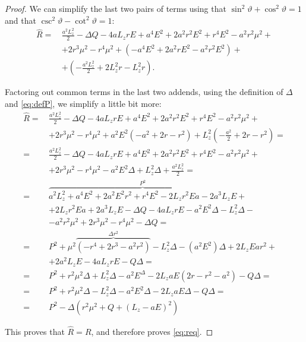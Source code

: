\begin{proof}
	We can simplify the last two pairs of terms using that $\sin^2 \vartheta + \cos^2 \vartheta = 1$ and that $\csc^2\vartheta - \cot^2\vartheta = 1$:
	\begin{align}
	\widehat{R} =\,& \frac{a^2L_z^2}{2} - \Delta Q - 4aL_zrE + a^4E^2 + 2a^2r^2E^2 + r^4E^2 - a^2r^2\mu^2 + \nonumber \\
	&+ 2r^3\mu^2 - r^4\mu^2 + \left(-a^4E^2 + 2a^2rE^2 - a^2r^2E^2 \right) + \nonumber \\
	&+ \left( -\frac{a^2L_z^2}{2} + 2L_z^2r - L_z^2r \right).
	\end{align}
	
	Factoring out common terms in the last two addends, using the definition of $\Delta$ and \autoref{eq:defP}, we simplify a little bit more:
	\begin{align}
	\widehat{R} =\,& \frac{a^2L_z^2}{2} - \Delta Q - 4aL_zrE + a^4E^2 + 2a^2r^2E^2 + r^4E^2 - a^2r^2\mu^2 + \nonumber \\
	&+ 2r^3\mu^2 - r^4\mu^2 + a^2E^2\left(-a^2 + 2r - r^2 \right) + L_z^2\left( -\frac{a^2}{2} + 2r - r^2 \right) = \nonumber \\
	=\,& \frac{a^2L_z^2}{2} - \Delta Q - 4aL_zrE + a^4E^2 + 2a^2r^2E^2 + r^4E^2 - a^2r^2\mu^2 + \nonumber \\
	&+ 2r^3\mu^2 - r^4\mu^2 - a^2E^2\Delta + L_z^2\Delta + \frac{a^2L_z^2}{2} = \nonumber \\
	=\,& \overbrace{a^2L_z^2 + a^4E^2 + 2a^2E^2r^2 + r^4E^2 - 2L_zr^2Ea - 2a^3L_zE}^{P^2} + \nonumber\\
	&+ 2L_zr^2Ea + 2a^3L_zE - \Delta Q - 4aL_zrE - a^2E^2\Delta - L_z^2\Delta - \nonumber \\
	&- a^2r^2\mu^2 + 2r^3\mu^2 - r^4\mu^2 - \Delta Q = \nonumber \\
	=\,& P^2 + \mu^2\overbrace{\left( -r^4 + 2r^3 - a^2r^2 \right)}^{\Delta r^2} - L_z^2\Delta - (a^2E^2)\Delta + 2L_zEar^2 + \nonumber\\
	&+ 2a^2L_zE - 4aL_zrE - Q\Delta = \nonumber\\
	=\,& P^2 + r^2\mu^2\Delta + L_z^2\Delta - a^2E^\Delta - 2L_zaE\left(2r - r^2 - a^2\right) - Q\Delta = \nonumber\\
	=\,& P^2 + r^2\mu^2\Delta - L_z^2 \Delta - a^2E^2\Delta - 2L_zaE\Delta - Q\Delta = \nonumber \\
	=\,& P^2 - \Delta \left( r^2\mu^2 + Q + \left(L_z - aE \right)^2 \right)
	\end{align}
	
	This proves that $\widehat{R} = R$, and therefore proves \autoref{eq:req}.
	

\end{proof}
